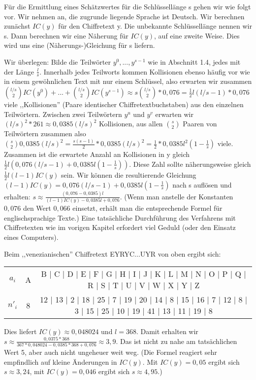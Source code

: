 \documentclass[a4paper]{article}
\begin{document}
\begin{multicols}{3}
    Für die Ermittlung eines Schätzwertes für die Schlüssellänge s gehen wir wie folgt vor. Wir nehmen an, die zugrunde liegende Sprache ist Deutsch. Wir berechnen zunächst $IC(y)$ für den Chiffretext y. Die unbekannte Schlüssellänge nennen wir s. Dann berechnen wir eine Näherung für $IC(y)$, auf eine zweite Weise. Dies wird uns eine (Näherungs-)Gleichung für s liefern.

    Wir überlegen: Bilde die Teilwörter $y^0,...,y^{s-1}$ wie in Abschnitt 1.4, jedes mit der Länge $\frac{l}{s}$. Innerhalb jedes Teilworts kommen Kollisionen ebenso häufig vor wie in einem gewöhnlichen Text mit nur einem Schlüssel, also erwarten wir zusammen $\binom{l/s}{2} IC(y^0)+...+\binom{l/s}{2} IC(y^{s-1})\approx s\binom{l/s}{2}* 0,076 = \frac{1}{2}l(l/s-1)* 0,076$ viele ,,Kollisionen'' (Paare identischer Chiffretextbuchstaben) aus den einzelnen Teilwörtern.
    Zwischen zwei Teilwörtern $y^u$ und $y^v$ erwarten wir $(l/s)^2*261\approx 0,0385(l/s)^2$ Kollisionen, aus allen $\binom{s}{2}$ Paaren von Teilwörtern zusammen also $\binom{s}{2} 0,0385(l/s)^2 =\frac{s(s-1)}{2}* 0,0385(l/s)^2 =\frac{1}{2} *0,0385 l^2 (1-\frac{1}{s})$ viele. Zusammen ist die erwartete Anzahl an Kollisionen in y gleich $\frac{1}{2}l(0,076(l/s-1) + 0,0385 l(1-\frac{1}{s}))$.
    Diese Zahl sollte näherungsweise gleich $\frac{1}{2}l(l-1)IC(y)$ sein. Wir können die resultierende Gleichung $(l-1)IC(y) = 0,076(l/s-1) + 0,0385 l(1-\frac{1}{s})$ nach s auflösen und erhalten: $s\approx \frac{(0,076-0,0385)l}{(l-1)IC(y)-0,0385l+0,076}$. (Wenn man anstelle der Konstanten $0,076$ den Wert $0,066$ einsetzt, erhält man die entsprechende Formel für englischsprachige Texte.)
    Eine tatsächliche Durchführung des Verfahrens mit Chiffretexten wie im vorigen Kapitel erfordert viel Geduld (oder den Einsatz eines Computers).

    Beim ,,venezianischen'' Chiffretext EYRYC...UYR von oben ergibt sich:
    \begin{tabular}{c|c|c}
    $a_i$ & A  & B  | C  | D  | E  | F  | G  | H  | I  | J  | K  | L  | M  | N  | O  | P  | Q  | R  | S  | T  | U  | V  | W  | X  | Y  | Z  \\
    $n'_i$ & 8  & 12 | 13 | 2  | 18 | 25 | 7  | 19 | 20 | 14 | 8  | 15 | 16 | 7  | 12 | 8  | 3  | 15 | 25 | 10 | 19 | 41 | 13 | 11 | 19 | 8  
    \end{tabular}

    Dies liefert $IC(y)\approx 0,048024$ und $l=368$. Damit erhalten wir $s\approx\frac{0,0375*368}{367 *0,048024-0,0385 *368+0,076}\approx 3,9$.
    Das ist nicht zu nahe am tatsächlichen Wert 5, aber auch nicht ungeheuer weit weg. (Die Formel reagiert sehr empfindlich auf kleine Änderungen in $IC(y)$. Mit $IC(y)=0,05$ ergibt sich $s\approx 3,24$, mit $IC(y)=0,046$ ergibt sich $s\approx 4,95$.)


\end{multicols}
\end{document}
